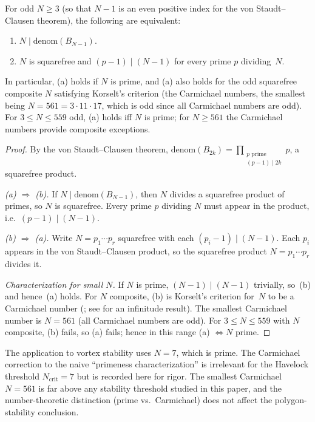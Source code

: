 \begin{theorem}
\label{thm:von-staudt-N}
For odd $N \ge 3$ (so that $N{-}1$ is an even positive index for the
von Staudt--Clausen theorem), the following are equivalent:
\begin{enumerate}[label=\textup{(\alph*)}]
\item $N \mid \mathrm{denom}(B_{N-1})$.
\item $N$ is squarefree and $(p{-}1) \mid (N{-}1)$ for every
  prime $p$ dividing~$N$.
\end{enumerate}
In particular, \textup{(a)} holds if $N$ is prime, and
\textup{(a)} also holds for the odd squarefree composite
$N$ satisfying Korselt's criterion (the Carmichael numbers,
the smallest being $N = 561 = 3 \cdot 11 \cdot 17$, which is odd
since all Carmichael numbers are odd).
For $3 \le N \le 559$ odd, \textup{(a)} holds iff $N$ is prime;
for $N \ge 561$ the Carmichael numbers provide composite
exceptions.
\end{theorem}

\begin{proof}
By the von Staudt--Clausen theorem,
$\mathrm{denom}(B_{2k}) = \prod_{\substack{p \text{ prime}\\(p-1)\mid 2k}} p$,
a squarefree product.

\emph{(a) $\Rightarrow$ (b).}  If $N \mid \mathrm{denom}(B_{N-1})$,
then $N$ divides a squarefree product of primes, so $N$ is
squarefree.  Every prime $p$ dividing $N$ must appear in the
product, i.e.\ $(p{-}1) \mid (N{-}1)$.

\emph{(b) $\Rightarrow$ (a).}  Write $N = p_1\cdots p_r$
squarefree with each $(p_i{-}1) \mid (N{-}1)$.  Each $p_i$
appears in the von Staudt--Clausen product, so the
squarefree product $N = p_1\cdots p_r$ divides it.

\emph{Characterization for small $N$.}  If $N$ is prime,
$(N{-}1) \mid (N{-}1)$ trivially, so~(b) and hence~(a) holds.
For $N$ composite, (b) is Korselt's criterion for~$N$ to be
a Carmichael number (\citealt{Korselt1899}; see
\citealt{AlfordGranvillePomerance1994} for an infinitude
result).  The smallest Carmichael number is
$N = 561$ (all Carmichael numbers are odd).  For $3 \le N \le 559$ with $N$ composite, (b)
fails, so (a) fails; hence in this range (a) $\iff N$ prime.
\end{proof}

\begin{remark}[Vortex interpretation at $N = 7$]
The application to vortex stability uses $N = 7$, which is
prime.  The Carmichael correction to the naive
``primeness characterization'' is irrelevant for the
Havelock threshold $N_{\mathrm{crit}} = 7$ but is recorded
here for rigor.  The smallest Carmichael $N = 561$ is far
above any stability threshold studied in this paper, and the
number-theoretic distinction (prime vs.\ Carmichael) does not
affect the polygon-stability conclusion.
\end{remark}

